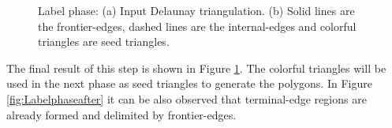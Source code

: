 

\begin{figure}[h]
\centering     %
{} \hspace{0.5cm} 
\caption{Label phase: (a) Input Delaunay triangulation. (b) Solid lines are the frontier-edges, dashed lines are the internal-edges and colorful triangles are seed triangles. }
\label{figs:label_phase} 
\end{figure}

The final result of this step is shown in Figure \ref{figs:label_phase}. The colorful triangles will be used in the next phase as seed triangles to generate the polygons.  In Figure \ref{fig:Labelphaseafter} it can be also observed that terminal-edge regions are already formed and delimited by frontier-edges. 



